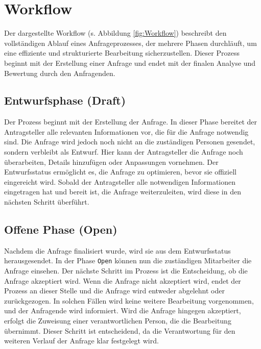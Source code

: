 \section{Workflow}
Der dargestellte Workflow (s. Abbildung \ref{fig:Workflow}) beschreibt den vollständigen Ablauf eines Anfrageprozesses, der mehrere Phasen durchläuft, um eine effiziente und strukturierte Bearbeitung sicherzustellen. Dieser Prozess beginnt mit der Erstellung einer Anfrage und endet mit der finalen Analyse und Bewertung durch den Anfragenden.
\subsection*{Entwurfsphase (Draft)}
Der Prozess beginnt mit der Erstellung der Anfrage. In dieser Phase bereitet der Antragsteller alle relevanten Informationen vor, die für die Anfrage notwendig sind. Die Anfrage wird jedoch noch nicht an die zuständigen Personen gesendet, sondern verbleibt als Entwurf. Hier kann der Antragsteller die Anfrage noch überarbeiten, Details hinzufügen oder Anpassungen vornehmen. Der Entwurfsstatus ermöglicht es, die Anfrage zu optimieren, bevor sie offiziell eingereicht wird. Sobald der Antragsteller alle notwendigen Informationen eingetragen hat und bereit ist, die Anfrage weiterzuleiten, wird diese in den nächsten Schritt überführt.
\subsection*{Offene Phase (Open)}
Nachdem die Anfrage finalisiert wurde, wird sie aus dem Entwurfsstatus herausgesendet. In der Phase \texttt{Open}  können nun die zuständigen Mitarbeiter die Anfrage einsehen.
\newline
Der nächste Schritt im Prozess ist die Entscheidung, ob die Anfrage akzeptiert wird. Wenn die Anfrage nicht akzeptiert wird, endet der Prozess an dieser Stelle und die Anfrage wird entweder abgelehnt oder zurückgezogen. In solchen Fällen wird keine weitere Bearbeitung vorgenommen, und der Anfragende wird informiert.
\newline
Wird die Anfrage hingegen akzeptiert, erfolgt die Zuweisung einer verantwortlichen Person, die die Bearbeitung übernimmt. Dieser Schritt ist entscheidend, da die Verantwortung für den weiteren Verlauf der Anfrage klar festgelegt wird.
